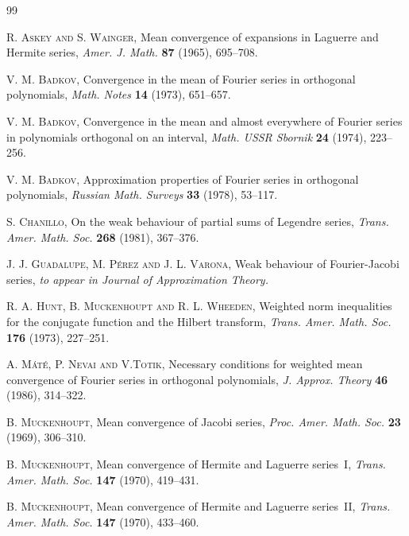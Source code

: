 \documentclass[11pt,a4paper]{article}
\theoremstyle{plain}
\theoremstyle{definition}
\theoremstyle{remark}
\begin{document}
\begin{thebibliography}{99}

\frenchspacing

\textsc{R. Askey and S. Wainger}, Mean convergence of expansions 
in Laguerre and Hermite series, \textit{Amer. J. Math.} \textbf{87} (1965), 
695--708.

\textsc{V. M. Badkov}, Convergence in the mean of Fourier series 
in orthogonal polynomials, \textit{Math. Notes} \textbf{14} (1973), 651--657.

\textsc{V. M. Badkov}, Convergence in the mean and almost everywhere 
of Fourier series in polynomials orthogonal on an interval, 
\textit{Math. USSR Sbornik} \textbf{24} (1974), 223--256.

\textsc{V. M. Badkov}, Approximation properties of Fourier series 
in orthogonal polynomials, \textit{Russian Math. Surveys} \textbf{33} (1978), 
53--117.

\textsc{S. Chanillo}, On the weak behaviour of partial 
sums of Legendre series, \textit{Trans. Amer. Math. Soc.} \textbf{268} 
(1981), 367--376.

\textsc{J. J. Guadalupe, M. P\'erez and J. L. Varona,} Weak behaviour 
of Fourier-Jacobi series, \textit{to appear in Journal of Approximation 
Theory.}

\textsc{R. A. Hunt, B. Muckenhoupt and R. L. Wheeden}, Weighted 
norm inequalities for the conjugate function and the Hilbert 
transform, \textit{Trans. Amer. Math. Soc.} \textbf{176} (1973), 227--251.

\textsc{A. M\'at\'e, P. Nevai and V.Totik}, Necessary conditions 
for weighted mean convergence of Fourier series in orthogonal 
polynomials, \textit{J. Approx. Theory} \textbf{46} (1986), 314--322.

\textsc{B. Muckenhoupt}, Mean convergence of Jacobi series, 
\textit{Proc. Amer. Math. Soc.} \textbf{23} (1969), 306--310.

\textsc{B. Muckenhoupt}, Mean convergence of Hermite and Laguerre 
series~I, \textit{Trans. Amer. Math. Soc.} \textbf{147} (1970), 419--431.

\textsc{B. Muckenhoupt}, Mean convergence of Hermite and Laguerre 
series~II, \textit{Trans. Amer. Math. Soc.} \textbf{147} (1970), 433--460.


\end{thebibliography}
\end{document}
